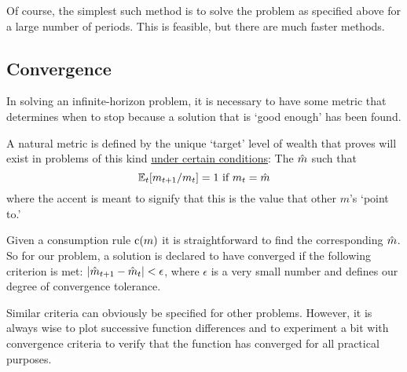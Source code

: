 \documentclass[titlepage, headings=optiontotocandhead]{Resources/texmf-local/tex/latex/econtex}
\begin{document}
Of course, the simplest such method is to solve the problem as
specified above for a large number of periods.  This is feasible, but
there are much faster methods.

\subsection{Convergence}

In solving an infinite-horizon problem, it is necessary to have some
metric that determines when to stop because a solution that is `good
enough' has been found.

A natural metric is defined by the unique `target' level of wealth that \cite{BufferStockTheory} proves
will exist in problems of this kind \href{https://llorracc.github.io/BufferStockTheory#GICNrm}{under certain conditions}: The $\hat{m}$ such that
\begin{equation}
  \operatorname{\mathbb{E}}_t [{m}_{t+1}/m_t] = 1 \mbox{~if~} m_t = \hat{m}  \label{eq:mTrgNrmet}
\end{equation}
where the accent is meant to signify that this is the value
that other $m$'s `point to.'

Given a consumption rule $\mathrm{c}(m)$ it is straightforward to find
the corresponding $\hat{m}$.  So for our problem, a solution is declared
to have converged if the following criterion is met:
$\left|\hat{m}_{t+1}-\hat{m}_{t}\right| < \epsilon$, where $\epsilon$ is
a very small number and defines our degree of convergence tolerance.

Similar criteria can obviously be specified for other problems.
However, it is always wise to plot successive function differences and
to experiment a bit with convergence criteria to verify that the
function has converged for all practical purposes.
\end{document}
